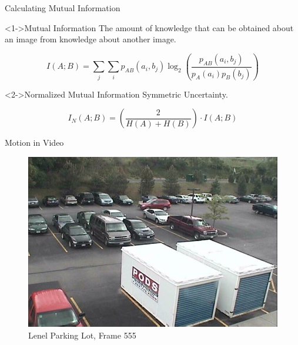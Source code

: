 \documentclass{beamer}
\begin{document}
\begin{frame}[c]{\sc Calculating Mutual Information}

\begin{block}<1->{Mutual Information}
The amount of knowledge that can be obtained about an image from knowledge about another image.

\begin{equation}
\label{MutualInformation}
	I(A;B) = \sum_{j}{\sum_{i}{p_{AB}(a_{i},b_{j}) \log_{2}{\left( \frac{p_{AB}(a_{i},b_{j})}{p_{A}(a_{i})p_{B}(b_{j})}\right)}}}
\end{equation}
\end{block}


\vfill

\begin{block}<2->{Normalized Mutual Information}
Symmetric Uncertainty.

\begin{equation}
\label{NormalizedMutualInformation}
	I_{N}(A;B) = \left( \frac{2}{H(A) + H(B)}\right) \cdot I(A;B)
\end{equation}
\end{block}

\end{frame}






\begin{frame}[c]{\sc Motion in Video}

\begin{figure}[!h]
\centering
\includegraphics[width=.9\columnwidth]{Lenel010L(555)}
\caption{Lenel Parking Lot, Frame 555}
\label{Lenel555}
\end{figure}

\end{frame}
\end{document}
